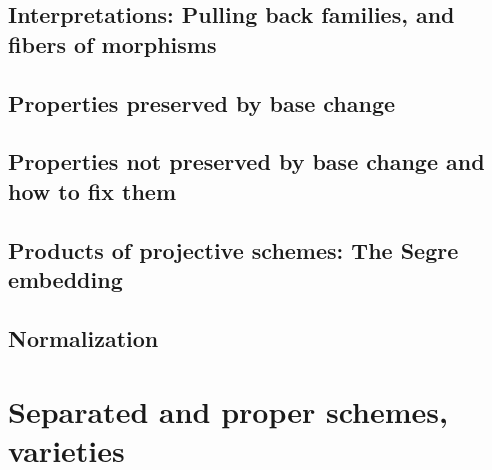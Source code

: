 \documentclass[11pt]{book} %
\begin{document}
\section{Interpretations: Pulling back families, and fibers of morphisms}
\section{Properties preserved by base change}
\section{Properties not preserved by base change and how to fix them}
\section{Products of projective schemes: The Segre embedding}
\section{Normalization}
\chapter{Separated and proper schemes, varieties}
\end{document}
